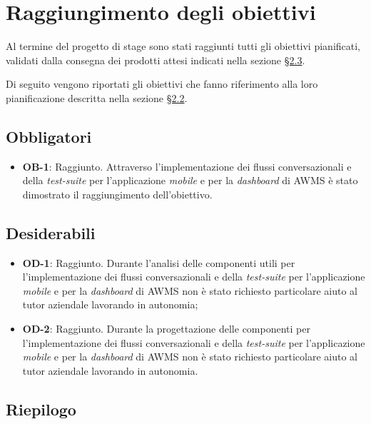 \section{Raggiungimento degli obiettivi}

Al termine del progetto di stage sono stati raggiunti tutti gli obiettivi pianificati, validati dalla consegna dei prodotti attesi indicati nella sezione \hyperref[cap:prodotti]{§2.3}.

Di seguito vengono riportati gli obiettivi che fanno riferimento alla loro pianificazione descritta nella sezione \hyperref[cap:obbiettivi]{§2.2}.

\subsection*{Obbligatori}
\begin{itemize}
	\item \textbf{OB-1}: Raggiunto. Attraverso l'implementazione dei flussi conversazionali e della \emph{test-suite} per l'applicazione \emph{mobile} e per la \emph{dashboard} di \gls{AWMS} è stato dimostrato il raggiungimento dell'obiettivo.
\end{itemize}
\subsection*{Desiderabili} 
\begin{itemize}
	\item \textbf{OD-1}: Raggiunto. Durante l'analisi delle componenti utili per l'implementazione dei flussi conversazionali e della \emph{test-suite} per l'applicazione \emph{mobile} e per la \emph{dashboard} di \gls{AWMS} non è stato richiesto particolare aiuto al tutor aziendale lavorando in autonomia;
	\item \textbf{OD-2}: Raggiunto. Durante la progettazione delle componenti per l'implementazione dei flussi conversazionali e della \emph{test-suite} per l'applicazione \emph{mobile} e per la \emph{dashboard} di \gls{AWMS} non è stato richiesto particolare aiuto al tutor aziendale lavorando in autonomia.
\end{itemize}

\subsection{Riepilogo}

